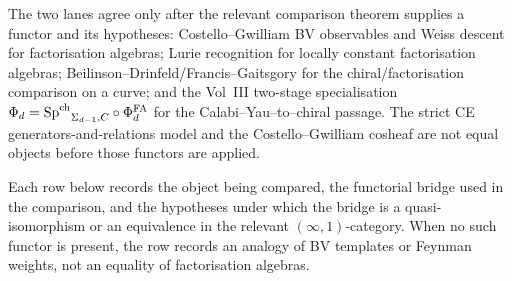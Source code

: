 The two lanes agree only after the relevant comparison theorem supplies
a functor and its hypotheses: Costello--Gwilliam BV observables and
Weiss descent for factorisation algebras; Lurie recognition for locally
constant factorisation algebras; Beilinson--Drinfeld/Francis--Gaitsgory
for the chiral/factorisation comparison on a curve; and the Vol~III
two-stage specialisation
$\Phi_d = {\mathrm{Sp}^{\mathrm{ch}}}_{\Sigma_{d-1}, C} \circ \Phi^{\mathrm{FA}}_d$ for the
Calabi--Yau--to--chiral passage. The strict CE
generators-and-relations model and the Costello--Gwilliam cosheaf are
not equal objects before those functors are applied.

Each row below records the object being compared, the functorial bridge
used in the comparison, and the hypotheses under which the bridge is a
quasi-isomorphism or an equivalence in the relevant
$(\infty,1)$-category. When no such functor is present, the row records
an analogy of BV templates or Feynman weights, not an equality of
factorisation algebras.

